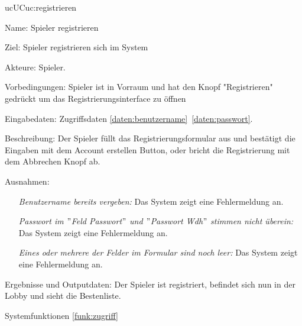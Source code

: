 \begin{description}[leftmargin=5em, style=sameline]

	\begin{lhp}{uc}{UC}{uc:registrieren} %
		\item [Name:] Spieler registrieren
		\item [Ziel:] Spieler registrieren sich im System
		\item [Akteure:] Spieler.
		\item [Vorbedingungen:] Spieler ist in Vorraum und hat den Knopf "Registrieren" gedrückt um das Registrierungsinterface zu öffnen
		\item [Eingabedaten:] Zugriffsdaten \ref{daten:benutzername}~\ref{daten:passwort}.
		\item [Beschreibung:] Der Spieler füllt das Registrierungsformular aus und bestätigt die Eingaben mit dem Account erstellen Button, oder bricht die Registrierung mit dem Abbrechen Knopf ab.
		\item [Ausnahmen:] \hfill
			\begin{itemize} 
				\item[] \textit{Benutzername bereits vergeben:} Das System zeigt eine Fehlermeldung an.
				\item[] \textit{Passwort im $"$Feld Passwort$"$ und $"$Passwort Wdh$"$ stimmen nicht überein:} Das System zeigt eine Fehlermeldung an.
				\item[] \textit{Eines oder mehrere der Felder im Formular sind noch leer:} Das System zeigt eine Fehlermeldung an.
			\end{itemize}
		\item [Ergebnisse und Outputdaten:] Der Spieler ist registriert, befindet sich nun in der Lobby und sieht die Bestenliste.
		\item [Systemfunktionen] \ref{funk:zugriff}
	\end{lhp}


\end{description}
